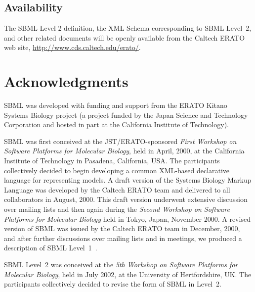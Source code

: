 \documentclass[10pt,twocolumntoc]{cekarticle}
\begin{document}
\subsection{Availability}
\label{sec:availability}

The SBML Level 2 definition, the XML Schema corresponding to SBML
Level~2, and other related documents will be openly available from the
Caltech ERATO web site, \url{http://www.cds.caltech.edu/erato/}.

\setcounter{secnumdepth}{-1}
\section{Acknowledgments}
\label{sec:acknowledgements}

SBML was developed with funding and support from the ERATO Kitano Systems
Biology project (a project funded by the Japan Science and Technology
Corporation and hosted in part at the California Institute of Technology).

SBML was first conceived at the JST/ERATO-sponsored \emph{First Workshop on
  Software Platforms for Molecular Biology}, held in April, 2000, at the
California Institute of Technology in Pasadena, California, USA.  The
participants collectively decided to begin developing a common XML-based
declarative language for representing models.  A draft version of the
Systems Biology Markup Language was developed by the Caltech ERATO team and
delivered to all collaborators in August, 2000.  This draft version
underwent extensive discussion over mailing lists and then again during the
\emph{Second Workshop on Software Platforms for Molecular Biology} held in
Tokyo, Japan, November 2000.  A revised version of SBML was issued by the
Caltech ERATO team in December, 2000, and after further discussions over
mailing lists and in meetings, we produced a description of SBML
Level~1~\citep{hucka:2001}.

SBML Level~2 was conceived at the \emph{5th Workshop on Software Platforms
  for Molecular Biology}, held in July 2002, at the University of
Hertfordshire, UK.  The participants collectively decided to revise the
form of SBML in Level~2.
\end{document}
